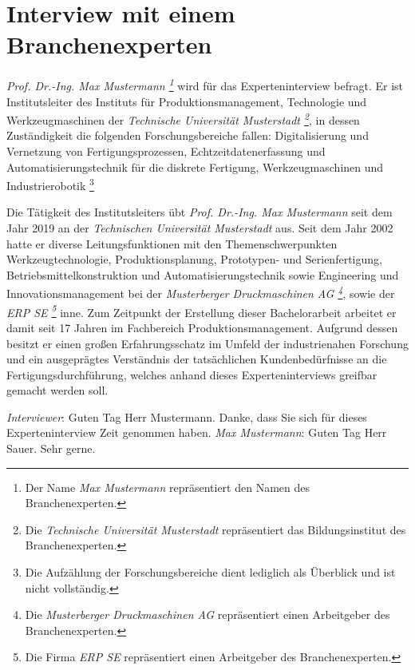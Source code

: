 \tocless\section{Interview mit einem Branchenexperten}

\textit{Prof. Dr.-Ing. Max Mustermann \footnote{Der Name \textit{Max Mustermann} repräsentiert den Namen des Branchenexperten.}} wird für das Experteninterview befragt.
Er ist Institutsleiter des Instituts für Produktionsmanagement, Technologie und Werkzeugmaschinen der \textit{Technische Universität Musterstadt \footnote{Die \textit{Technische Universität Musterstadt} repräsentiert das Bildungsinstitut des Branchenexperten.}}, in dessen Zuständigkeit die folgenden Forschungsbereiche fallen: Digitalisierung und Vernetzung von Fertigungsprozessen, Echtzeitdatenerfassung und Automatisierungstechnik für die diskrete Fertigung, Werkzeugmaschinen und Industrierobotik \footnote{Die Aufzählung der Forschungsbereiche dient lediglich als Überblick und ist nicht vollständig.}

Die Tätigkeit des Institutsleiters übt \textit{Prof. Dr.-Ing. Max Mustermann} seit dem Jahr 2019 an der \textit{Technischen Universität Musterstadt} aus. Seit dem Jahr 2002 hatte er diverse Leitungsfunktionen mit den Themenschwerpunkten Werkzeugtechnologie, Produktionsplanung, Prototypen- und Serienfertigung, Betriebsmittelkonstruktion und Automatisierungstechnik sowie Engineering und Innovationsmanagement bei der \textit{Musterberger Druckmaschinen AG \footnote{Die \textit{Musterberger Druckmaschinen AG} repräsentiert einen Arbeitgeber des Branchenexperten.}}, sowie der \textit{ERP SE \footnote{Die Firma \textit{ERP SE} repräsentiert einen Arbeitgeber des Branchenexperten.}} inne. Zum Zeitpunkt der Erstellung dieser Bachelorarbeit arbeitet er damit seit 17 Jahren im Fachbereich Produktionsmanagement. Aufgrund dessen besitzt er einen großen Erfahrungsschatz im Umfeld der industrienahen Forschung und ein ausgeprägtes Verständnis der tatsächlichen Kundenbedürfnisse an die Fertigungsdurchführung, welches anhand dieses Experteninterviews greifbar gemacht werden soll.

\textit{Interviewer}: Guten Tag Herr Mustermann. Danke, dass Sie sich für dieses Experteninterview Zeit genommen haben.
\newline
\textit{Max Mustermann}: Guten Tag Herr Sauer. Sehr gerne.

